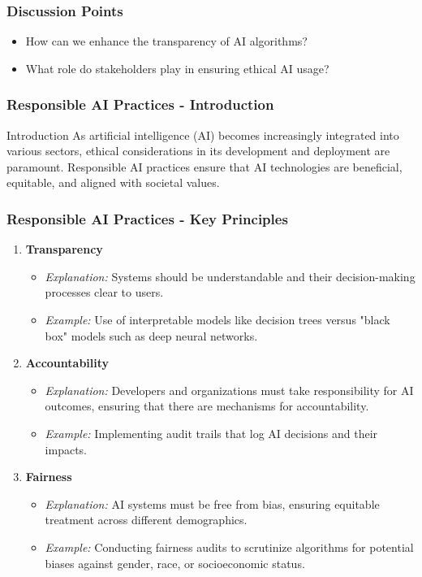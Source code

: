 \documentclass{beamer}
\begin{document}
\begin{frame}[fragile]
    \frametitle{Discussion Points}
    \begin{itemize}
        \item How can we enhance the transparency of AI algorithms?
        \item What role do stakeholders play in ensuring ethical AI usage?
    \end{itemize}
\end{frame}

\begin{frame}[fragile]
    \frametitle{Responsible AI Practices - Introduction}
    \begin{block}{Introduction}
        As artificial intelligence (AI) becomes increasingly integrated into various sectors, ethical considerations in its development and deployment are paramount. Responsible AI practices ensure that AI technologies are beneficial, equitable, and aligned with societal values.
    \end{block}
\end{frame}

\begin{frame}[fragile]
    \frametitle{Responsible AI Practices - Key Principles}
    \begin{enumerate}
        \item \textbf{Transparency}
        \begin{itemize}
            \item \textit{Explanation:} Systems should be understandable and their decision-making processes clear to users.
            \item \textit{Example:} Use of interpretable models like decision trees versus "black box" models such as deep neural networks.
        \end{itemize}
        
        \item \textbf{Accountability}
        \begin{itemize}
            \item \textit{Explanation:} Developers and organizations must take responsibility for AI outcomes, ensuring that there are mechanisms for accountability.
            \item \textit{Example:} Implementing audit trails that log AI decisions and their impacts.
        \end{itemize}
        
        \item \textbf{Fairness}
        \begin{itemize}
            \item \textit{Explanation:} AI systems must be free from bias, ensuring equitable treatment across different demographics.
            \item \textit{Example:} Conducting fairness audits to scrutinize algorithms for potential biases against gender, race, or socioeconomic status.
        \end{itemize}
    \end{enumerate}
\end{frame}
\end{document}
